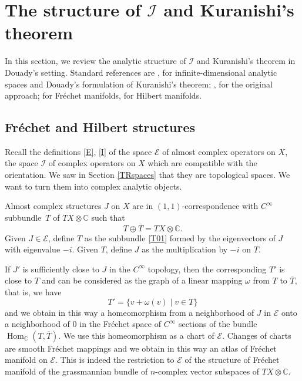 \documentclass[10pt]{amsart}
\let\mathcal\mathscr
\DeclareMathOperator{\Hom}{Hom}
\theoremstyle{plain}
\theoremstyle{definition}
\theoremstyle{remark}
\numberwithin{equation}{section}
\newcommand{\CC}{{\mathbb{C}}}
\newcommand{\cI}{\mathcal{I}}
\begin{document}
\section{The structure of \texorpdfstring{$\cI$}{I} and Kuranishi's theorem}
\label{Istructure}

In this section, we review the analytic structure of $\cI$ and Kuranishi's theorem in Douady's setting. Standard references are \cite{Douady}, \cite{DouadyBourbaki} for infinite-dimensional analytic spaces and Douady's formulation of Kuranishi's theorem; \cite{Kur1}, \cite{Ku3} for the original approach; \cite[\S I.4]{Hamilton} for Fréchet manifolds, \cite{Lang} for Hilbert manifolds.

\subsection{Fréchet and Hilbert structures}
\label{FrHilb}

Recall the definitions \eqref{E}, \resp \eqref{I} of the space $\mathcal E$ of almost complex operators on $X$, \resp the space $\cI$ of complex operators on $X$ which are compatible with the orientation. We saw in Section \ref{TRspaces} that they are topological spaces. We want to turn them into complex analytic objects.

Almost complex structures $J$ on $X$ are in $(1,1)$-correspondence with $C^\infty$ subbundle~$T$ of $TX\otimes \CC$ such that
\begin{equation*}
T\oplus\overline{T}=TX\otimes \CC.
\end{equation*}
Given $J\in\mathcal E$, define $T$ as the subbundle \eqref{T01} formed by the eigenvectors of $J$ with eigenvalue $-i$. Given $T$, define $J$ as the multiplication by $-i$ on $T$.

If $J'$ is sufficiently close to $J$ in the $C^\infty$ topology, then the corresponding $T'$ is close to $T$ and can be considered as the graph of a linear mapping $\omega$ from $T$ to $\overline{T}$, that is, we have
\begin{equation*}
T'=\{v+\omega (v)\mid v\in T\}
\end{equation*}
and we obtain in this way a homeomorphism from a neighborhood of $J$ in $\mathcal E$ onto a neighborhood of $0$ in the Fréchet space of $C^\infty$ sections of the bundle $\Hom_{\CC}(T,\overline{T})$.
We use this homeomorphism as a chart of $\mathcal E$. Changes of charts are smooth Fréchet mappings and we obtain in this way an atlas of Fréchet manifold on $\mathcal E$. This is indeed the restriction to $\mathcal E$ of the structure of Fréchet manifold of the grassmannian bundle of $n$-complex vector subspaces of $TX\otimes\CC$.
\end{document}
